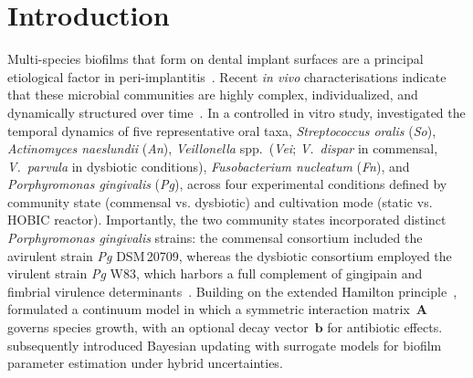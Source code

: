 \documentclass[pdflatex,sn-mathphys-ay,lineno]{sn-jnl}%
\begin{document}

\maketitle


\section{Introduction}
\label{sec:intro}

Multi-species biofilms that form on dental implant surfaces are a principal etiological factor in peri-implantitis~\citep{Kolenbrander2010OralMultispecies, Marsh2003Dental}. Recent \textit{in vivo} characterisations indicate that these microbial communities are highly complex, individualized, and dynamically structured over time~\citep{dieckow2024structure, cui2025microbial}.
In a controlled in vitro study, \citet{heine2025influence} investigated the temporal dynamics of five representative oral taxa, \textit{Streptococcus oralis} (\textit{So}), \textit{Actinomyces naeslundii} (\textit{An}), \textit{Veillonella} spp.\ (\textit{Vei}; \textit{V.~dispar} in commensal, \textit{V.~parvula} in dysbiotic conditions), \textit{Fusobacterium nucleatum} (\textit{Fn}), and \textit{Porphyromonas gingivalis} (\textit{Pg}), across four experimental conditions defined by community state (commensal vs. dysbiotic) and cultivation mode (static vs. HOBIC reactor).
Importantly, the two community states incorporated distinct \textit{Porphyromonas gingivalis} strains: the commensal consortium included the avirulent strain \textit{Pg} DSM\,20709, whereas the dysbiotic consortium employed the virulent strain \textit{Pg} W83, which harbors a full complement of gingipain and fimbrial virulence determinants~\citep{heine2025influence}.
Building on the extended Hamilton principle~\citep{JunkerBalzani2021ExtendedHamilton}, \citet{Klempt2025ContinuumBiofilm} formulated a continuum model in which a symmetric interaction matrix~$\mathbf{A}$ governs species growth, with an optional decay vector~$\mathbf{b}$ for antibiotic effects.
\citet{Fritsch2025BayesianMicrofilms} subsequently introduced Bayesian updating with surrogate models for biofilm parameter estimation under hybrid uncertainties.
\end{document}
